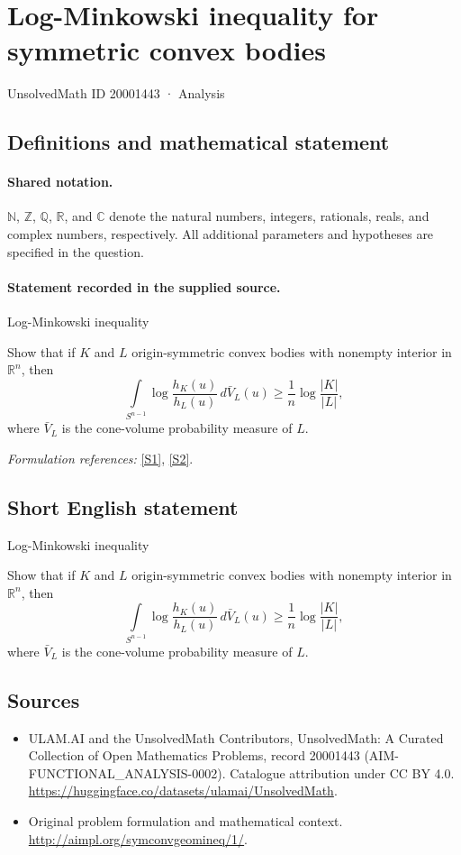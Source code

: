 \documentclass[11pt]{article}
\newcommand{\R}{\mathbb R}
\newcommand{\sref}[2]{\hyperlink{source:#1:#2}{[S#2]}}
\begin{document}
\setcounter{section}{20001442}
\section{Log-Minkowski inequality for symmetric convex bodies}\label{20001443}
{\small UnsolvedMath ID 20001443 · Analysis}
\subsection{Definitions and mathematical statement}

\paragraph{Shared notation.}$\mathbb N$, $\mathbb Z$, $\mathbb Q$, $\mathbb R$, and $\mathbb C$ denote the natural numbers, integers, rationals, reals, and complex numbers, respectively. All additional parameters and hypotheses are specified in the question.


\paragraph{Statement recorded in the supplied source.}
Log-Minkowski inequality

Show that if $K$ and $L$ origin-symmetric convex bodies with nonempty interior in $\R^n$, then
$$
\int\limits_{S^{n-1}} \log{\frac{h_K(u)}{h_L(u)}}\,d\bar{V}_L(u) \geq \frac1n \log{\frac{|K|}{|L|}},
$$
where $\bar{V}_L$ is the cone-volume probability measure of $L$.
\par\smallskip\textit{Formulation references:} \sref{20001443}{1}, \sref{20001443}{2}.
\subsection{Short English statement}
Log-Minkowski inequality

Show that if $K$ and $L$ origin-symmetric convex bodies with nonempty interior in $\R^n$, then
$$
\int\limits_{S^{n-1}} \log{\frac{h_K(u)}{h_L(u)}}\,d\bar{V}_L(u) \geq \frac1n \log{\frac{|K|}{|L|}},
$$
where $\bar{V}_L$ is the cone-volume probability measure of $L$.
\subsection{Sources}
\begin{itemize}
\item[\hypertarget{source:20001443:1}{S1}] ULAM.AI and the UnsolvedMath Contributors, UnsolvedMath: A Curated Collection of Open Mathematics Problems, record 20001443 (AIM-FUNCTIONAL\_ANALYSIS-0002). Catalogue attribution under CC BY 4.0.
\url{https://huggingface.co/datasets/ulamai/UnsolvedMath}.
\item[\hypertarget{source:20001443:2}{S2}] Original problem formulation and mathematical context.
\url{http://aimpl.org/symconvgeomineq/1/}.
\end{itemize}
\label{end:20001443}
\end{document}
